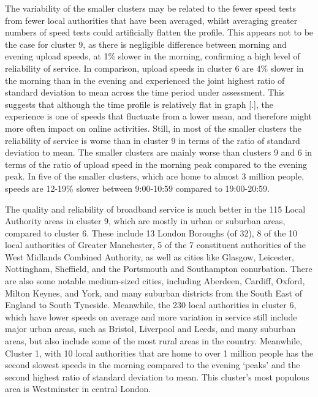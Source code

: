 \documentclass[]{interact}
\theoremstyle{plain}%
\theoremstyle{definition}
\theoremstyle{remark}
\begin{document}
The variability of the smaller clusters may be related to the fewer
speed tests from fewer local authorities that have been averaged, whilst
averaging greater numbers of speed tests could artificially flatten the
profile. This appears not to be the case for cluster 9, as there is
negligible difference between morning and evening upload speeds, at 1\%
slower in the morning, confirming a high level of reliability of
service. In comparison, upload speeds in cluster 6 are 4\% slower in the
morning than in the evening and experienced the joint highest ratio of
standard deviation to mean across the time period under assessment. This
suggests that although the time profile is relatively flat in graph
{[}.{]}, the experience is one of speeds that fluctuate from a lower
mean, and therefore might more often impact on online activities. Still,
in most of the smaller clusters the reliability of service is worse than
in cluster 9 in terms of the ratio of standard deviation to mean. The
smaller clusters are mainly worse than clusters 9 and 6 in terms of the
ratio of upload speed in the morning peak compared to the evening peak.
In five of the smaller clusters, which are home to almost 3 million
people, speeds are 12-19\% slower between 9:00-10:59 compared to
19:00-20:59.

The quality and reliability of broadband service is much better in the
115 Local Authority areas in cluster 9, which are mostly in urban or
suburban areas, compared to cluster 6. These include 13 London Boroughs
(of 32), 8 of the 10 local authorities of Greater Manchester, 5 of the 7
constituent authorities of the West Midlands Combined Authority, as well
as cities like Glasgow, Leicester, Nottingham, Sheffield, and the
Portsmouth and Southampton conurbation. There are also some notable
medium-sized cities, including Aberdeen, Cardiff, Oxford, Milton Keynes,
and York, and many suburban districts from the South East of England to
South Tyneside. Meanwhile, the 230 local authorities in cluster 6, which
have lower speeds on average and more variation in service still include
major urban areas, such as Bristol, Liverpool and Leeds, and many
suburban areas, but also include some of the most rural areas in the
country. Meanwhile, Cluster 1, with 10 local authorities that are home
to over 1 million people has the second slowest speeds in the morning
compared to the evening `peaks' and the second highest ratio of standard
deviation to mean. This cluster's most populous area is Westminster in
central London.
\end{document}

